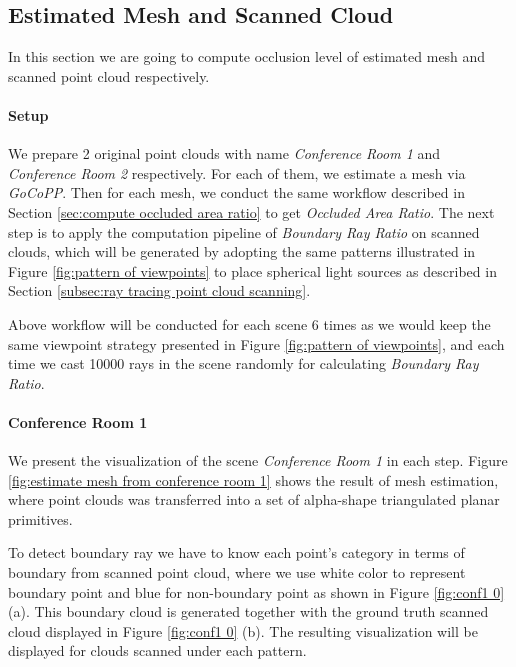 \documentclass[11pt, a4paper,oneside,chapterprefix=false]{scrbook}
\begin{document}
\subsection{Estimated Mesh and Scanned Cloud} \label{subsec:estimate mesh and scanned cloud}

In this section we are going to compute occlusion level of estimated mesh and scanned point cloud respectively. 

\paragraph{Setup}

We prepare 2 original point clouds with name \emph{Conference Room 1} and \emph{Conference Room 2} respectively. For each of them, we estimate a mesh via \emph{GoCoPP}. Then for each mesh, we conduct the same workflow described in Section \ref{sec:compute occluded area ratio} to get \emph{Occluded Area Ratio}. The next step is to apply the computation pipeline of \emph{Boundary Ray Ratio} on scanned clouds, which will be generated by adopting the same patterns illustrated in Figure \ref{fig:pattern of viewpoints} to place spherical light sources as described in Section \ref{subsec:ray tracing point cloud scanning}.

\vspace{10pt}

Above workflow will be conducted for each scene 6 times as we would keep the same viewpoint strategy presented in Figure \ref{fig:pattern of viewpoints}, and each time we cast 10000 rays in the scene randomly for calculating \emph{Boundary Ray Ratio}.    

\paragraph{Conference Room 1} \label{par:conf1 result}

We present the visualization of the scene \emph{Conference Room 1} in each step. Figure \ref{fig:estimate mesh from conference room 1} shows the result of mesh estimation, where point clouds was transferred into a set of alpha-shape triangulated planar primitives.

\vspace{10pt}

To detect boundary ray we have to know each point's category in terms of boundary from scanned point cloud, where we use white color to represent boundary point and blue for non-boundary point as shown in Figure \ref{fig:conf1 0} (a). This boundary cloud is generated together with the ground truth scanned cloud displayed in Figure \ref{fig:conf1 0} (b). The resulting visualization will be displayed for clouds scanned under each pattern.
\end{document}
